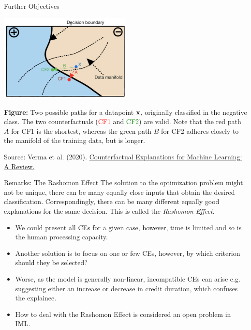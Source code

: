 \documentclass[11pt,compress,t,notes=noshow, xcolor=table]{beamer}
\begin{document}
\begin{vbframe}{Further Objectives}
	\begin{center}
		\includegraphics[width=0.5\textwidth]{figure/counterfactuals_obj}
	\end{center}

\scriptsize{\textbf{Figure:} Two possible paths for a datapoint \textcolor{blue}{$\xv$},
	originally classified in the negative class. The two counterfactuals (\textcolor{red}{CF1} and \textcolor{green}{CF2}) are valid. Note that the red path $A$ for CF1 is the shortest, whereas the
	green path $B$ for CF2 adheres closely to the manifold of the training data, but is longer.}
\vspace{0.3cm}

\tiny{Source: Verma et al. (2020). \href{https://arxiv.org/pdf/2010.10596.pdf}{Counterfactual Explanations for Machine Learning: A Review.}}

\end{vbframe}

\begin{vbframe}{Remarks: The Rashomon Effect}
The solution to the optimization problem might not be unique, there can be many equally close inputs that obtain the desired classification. Correspondingly, there can be many different equally good explanations for the same decision. This is called the \emph{Rashomon Effect}.
	\begin{itemize}
		\item We could present all CEs for a given case, however, time is limited and so is the human processing capacity.
		\item Another solution is to focus on one or few CEs, however, by which criterion should they be selected?
		\item Worse, as the model is generally non-linear, incompatible CEs can arise e.g. suggesting either an increase or decrease in credit duration, which confuses the explainee.
		\item How to deal with the Rashomon Effect is considered an open problem in IML.
	\end{itemize}
\end{vbframe}
\end{document}
